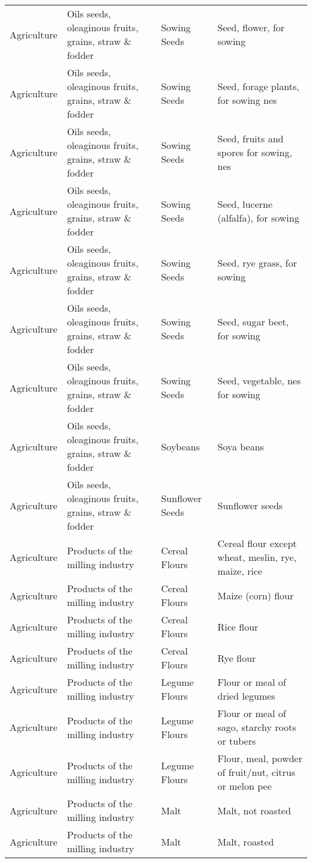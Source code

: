 \begin{appendices}
\begin{xltabular}{\textwidth}{|p{0.07\textwidth}|p{0.28\textwidth}|p{0.24\textwidth}|p{0.31\textwidth}|}
	Agriculture & Oils seeds, oleaginous fruits, grains, straw \& fodder & Sowing Seeds & Seed, flower, for sowing \\
	Agriculture & Oils seeds, oleaginous fruits, grains, straw \& fodder & Sowing Seeds & Seed, forage plants, for sowing nes \\
	Agriculture & Oils seeds, oleaginous fruits, grains, straw \& fodder & Sowing Seeds & Seed, fruits and spores for sowing, nes \\
	Agriculture & Oils seeds, oleaginous fruits, grains, straw \& fodder & Sowing Seeds & Seed, lucerne (alfalfa), for sowing \\
	Agriculture & Oils seeds, oleaginous fruits, grains, straw \& fodder & Sowing Seeds & Seed, rye grass, for sowing \\
	Agriculture & Oils seeds, oleaginous fruits, grains, straw \& fodder & Sowing Seeds & Seed, sugar beet, for sowing \\
	Agriculture & Oils seeds, oleaginous fruits, grains, straw \& fodder & Sowing Seeds & Seed, vegetable, nes for sowing \\
	Agriculture & Oils seeds, oleaginous fruits, grains, straw \& fodder & Soybeans & Soya beans \\
	Agriculture & Oils seeds, oleaginous fruits, grains, straw \& fodder & Sunflower Seeds & Sunflower seeds \\
	Agriculture & Products of the milling industry & Cereal Flours & Cereal flour except wheat, meslin, rye, maize, rice \\
	Agriculture & Products of the milling industry & Cereal Flours & Maize (corn) flour \\
	Agriculture & Products of the milling industry & Cereal Flours & Rice flour \\
	Agriculture & Products of the milling industry & Cereal Flours & Rye flour \\
	Agriculture & Products of the milling industry & Legume Flours & Flour or meal of dried legumes \\
	Agriculture & Products of the milling industry & Legume Flours & Flour or meal of sago, starchy roots or tubers \\
	Agriculture & Products of the milling industry & Legume Flours & Flour, meal, powder of fruit/nut, citrus or melon pee \\
	Agriculture & Products of the milling industry & Malt & Malt, not roasted \\
	Agriculture & Products of the milling industry & Malt & Malt, roasted \\

\end{xltabular}
\end{appendices}
